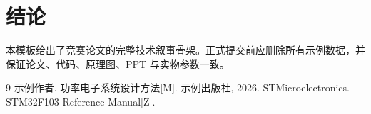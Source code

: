 \documentclass[UTF8,a4paper,12pt,fontset=fandol]{ctexart}
\begin{document}
\section{结论}
本模板给出了竞赛论文的完整技术叙事骨架。正式提交前应删除所有示例数据，并保证论文、代码、原理图、PPT 与实物参数一致。

\begin{thebibliography}{9}
 示例作者. 功率电子系统设计方法[M]. 示例出版社, 2026.
 STMicroelectronics. STM32F103 Reference Manual[Z].
\end{thebibliography}
\end{document}
